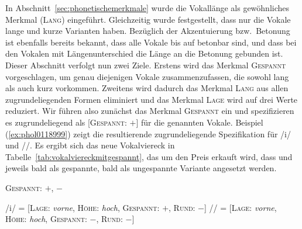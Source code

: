 In Abschnitt~\ref{sec:phonetischemerkmale} wurde die Vokallänge als gewöhnliches Merkmal (\textsc{Lang}) eingeführt.
Gleichzeitig wurde festgestellt, dass nur die Vokale \textipa{[i y u e \o\ E o a]} lange und kurze Varianten haben.
Bezüglich der Akzentuierung bzw.\ Betonung ist ebenfalls bereits bekannt, dass alle Vokale bis auf \textipa{[@ 5]} betonbar sind, und dass bei den Vokalen mit Längenunterschied die Länge an die Betonung gebunden ist.
Dieser Abschnitt verfolgt nun zwei Ziele.
Erstens wird das Merkmal \textsc{Gespannt} vorgeschlagen, um genau diejenigen Vokale zusammenzufassen, die sowohl lang als auch kurz vorkommen.
Zweitens wird dadurch das Merkmal \textsc{Lang} aus allen zugrundeliegenden Formen eliminiert und das Merkmal \textsc{Lage} wird auf drei Werte reduziert.
Wir führen also zunächst das Merkmal \textsc{Gespannt} ein und spezifizieren es zugrundeliegend als [\textsc{Gespannt}: $+$] für die genannten Vokale.
Beispiel (\ref{ex:phol0118999}) zeigt die resultierende zugrundeliegende Spezifikation für /i/ und //.
Es ergibt sich das neue Vokalviereck in Tabelle~\ref{tab:vokalviereckmitgespannt}, das um den Preis erkauft wird, dass \textipa{[E]} und \textipa{[a]} jeweils bald als gespannte, bald als ungespannte Variante angesetzt werden.

\begin{exe}
  \ex \textsc{Gespannt}: $+$, $-$
  \ex\label{ex:phol0118999}
  \begin{xlist}
  	\ex /i/ = [\textsc{Lage}: \textit{vorne}, \textsc{Höhe}: \textit{hoch}, \textsc{Gespannt}: $+$, \textsc{Rund}: $-$]
  	\ex // = [\textsc{Lage}: \textit{vorne}, \textsc{Höhe}: \textit{hoch}, \textsc{Gespannt}: $-$, \textsc{Rund}: $-$]
  \end{xlist}
\end{exe}

